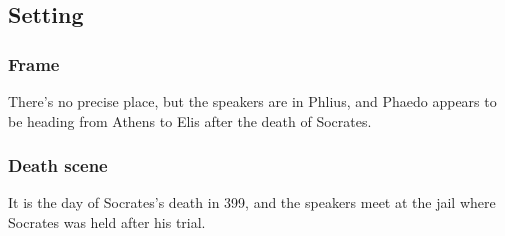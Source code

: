 \documentclass[12pt,letterpaper]{article}
\begin{document}

\subsection{Setting}

\subsubsection{Frame}

There's no precise place, but the speakers are in Phlius, and Phaedo appears to be heading from Athens to Elis after the death of Socrates.

\subsubsection{Death scene}

It is the day of Socrates's death in 399, and the speakers meet at the jail where Socrates was held after his trial.




\newpage
\printbibliography
\end{document}
